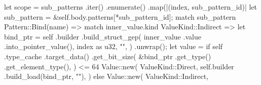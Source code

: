 \documentclass[
  oneside,
  english,
  coorientadorbanca,
  noabntexcite
]{ufsc-thesis-rn46-2019}
\begin{document}
\begin{rustcode}
{{{{{{{{                                    let scope = sub_patterns
                                        .iter()
                                        .enumerate()
                                        .map(|(index, sub_pattern_id)| {
                                            let sub_pattern = &self.body.patterns[*sub_pattern_id];
                                            match sub_pattern {
                                                Pattern::Bind(name) => match inner_value.kind {
                                                    ValueKind::Indirect => {
                                                        let bind_ptr = self
                                                            .builder
                                                            .build_struct_gep(
                                                                inner_value
                                                                    .value
                                                                    .into_pointer_value(),
                                                                index as u32,
                                                                "",
                                                            )
                                                            .unwrap();
                                                        let value = if self
                                                            .type_cache
                                                            .target_data()
                                                            .get_bit_size(
                                                                &bind_ptr
                                                                    .get_type()
                                                                    .get_element_type(),
                                                            )
                                                            <= 64
                                                        {
                                                            Value::new(
                                                                ValueKind::Direct,
                                                                self.builder
                                                                    .build_load(bind_ptr, ""),
                                                            )
                                                        } else {
                                                            Value::new(
                                                                ValueKind::Indirect,
}}}}}}}}}}}}}
\end{rustcode}
\end{document}
